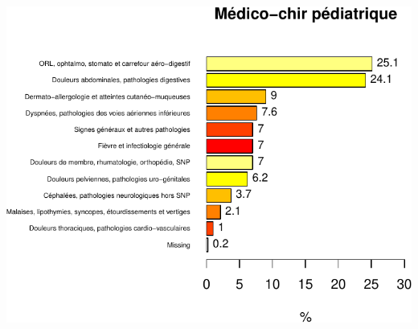 \documentclass[]{article}
\begin{document}
\includegraphics{analyse_merge_files/figure-latex/chap_ped_med-1.pdf}
\end{document}
